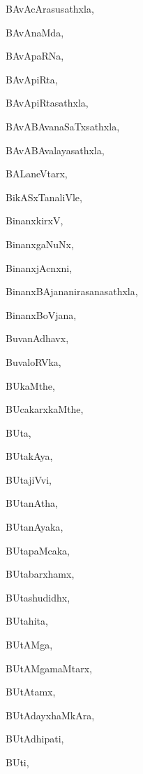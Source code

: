 \begin{multicols}{2}
{BAvAcArasusathxla}, \pageref{BAvAcArasusathxla}

{BAvAnaMda}, \pageref{BAvAnaMda}

{BAvApaRNa}, \pageref{BAvApaRNa}

{BAvApiRta}, \pageref{BAvApiRta}

{BAvApiRtasathxla}, \pageref{BAvApiRtasathxla}

{BAvABAvanaSaTxsathxla}, \pageref{BAvABAvanaSaTxsathxla}

{BAvABAvalayasathxla}, \pageref{BAvABAvalayasathxla}

{BALaneVtarx}, \pageref{BALaneVtarx}

{BikASxTanaliVle}, \pageref{BikASxTanaliVle}

{BinanxkirxV}, \pageref{BinanxkirxV}

{BinanxgaNuNx}, \pageref{BinanxgaNuNx}

{BinanxjAcnxni}, \pageref{BinanxjAcnxni}

{BinanxBAjananirasanasathxla}, \pageref{BinanxBAjananirasanasathxla}

{BinanxBoVjana}, \pageref{BinanxBoVjana}

{BuvanAdhavx}, \pageref{BuvanAdhavx}

{BuvaloRVka}, \pageref{BuvaloRVka}

{BUkaMthe}, \pageref{BUkaMthe}

{BUcakarxkaMthe}, \pageref{BUcakarxkaMthe}

{BUta}, \pageref{BUta}

{BUtakAya}, \pageref{BUtakAya}

{BUtajiVvi}, \pageref{BUtajiVvi}

{BUtanAtha}, \pageref{BUtanAtha}

{BUtanAyaka}, \pageref{BUtanAyaka}

{BUtapaMcaka}, \pageref{BUtapaMcaka}

{BUtabarxhamx}, \pageref{BUtabarxhamx}

{BUtashudidhx}, \pageref{BUtashudidhx}

{BUtahita}, \pageref{BUtahita}

{BUtAMga}, \pageref{BUtAMga}

{BUtAMgamaMtarx}, \pageref{BUtAMgamaMtarx}

{BUtAtamx}, \pageref{BUtAtamx}

{BUtAdayxhaMkAra}, \pageref{BUtAdayxhaMkAra}

{BUtAdhipati}, \pageref{BUtAdhipati}

{BUti}, \pageref{BUti}


\end{multicols}
